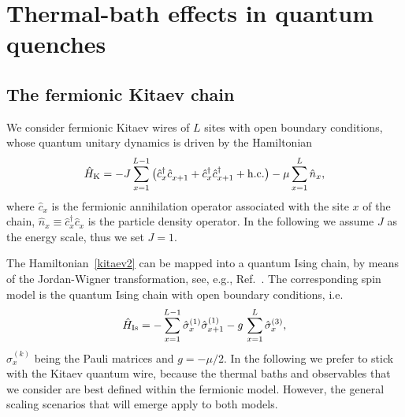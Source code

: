 \section{Thermal-bath effects in quantum quenches}

\label{modbath}

\subsection{The fermionic Kitaev chain}
\label{kitaevmod}

We consider fermionic Kitaev wires of $L$ sites with open boundary
conditions, whose quantum unitary dynamics is driven by the
Hamiltonian~\cite{Kitaev-2001}
\begin{equation}
  \hat H_{\rm K} = - J \sum_{x=1}^{L-1} \big( \hat c_x^\dagger \hat
  c_{x+1}^{\phantom\dagger} +
  \hat c_x^\dagger \hat c_{x+1}^\dagger+{\rm h.c.}
  \big) - \mu \sum_{x=1}^L \hat n_x ,
  \label{kitaev2}
\end{equation}
where $\hat c_x$ is the fermionic annihilation operator associated
with the site $x$ of the chain, $\hat n_x\equiv \hat
c_x^\dagger \hat c_x^{\phantom\dagger}$ is the particle density
operator.  In the following we assume $J$ as the energy scale, thus we
set $J=1$.

The Hamiltonian~\eqref{kitaev2} can be mapped into a quantum Ising
chain, by means of the Jordan-Wigner transformation, see, e.g.,
Ref.~\cite{S99}.  The corresponding spin model is the
quantum Ising chain with open boundary conditions, i.e.
\begin{equation}
  \hat H_{\rm Is} = -\sum_{x=1}^{L-1} \hat \sigma^{(1)}_x \hat
  \sigma^{(1)}_{x+1} - g\, \sum_{x=1}^L \hat \sigma^{(3)}_x,
  \label{isham}
\end{equation}
$\hat \sigma^{(k)}_x$ being the Pauli matrices and $g=-\mu/2$.  In the
following we prefer to stick with the Kitaev quantum wire, because the
thermal baths and observables that we consider are best defined within
the fermionic model. However, the general scaling scenarios that will
emerge apply to both models.

